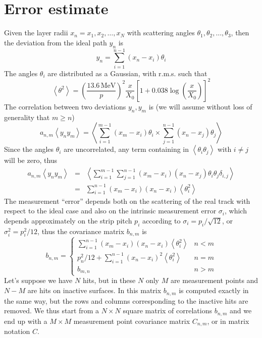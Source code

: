 \documentclass[10pt,a4paper]{article}
\begin{document}
\section{Error estimate}
Given the layer radii $x_n = x_1, x_2, \ldots, x_N$ with scattering angles $\theta_1, \theta_2, \ldots, \theta_3$, then
the deviation from the ideal path $y_n$ is
\begin{equation}
y_n=\sum_{i=1}^{n-1} \left (  x_n - x_i \right ) \theta_i
\end{equation}
The angles $\theta_i$ are distributed as a Gaussian, with r.m.s. such that
\begin{equation}
\left < \theta^2 \right > =
    \left ( \frac {13.6\,\mathrm{MeV}} {p} \right )^2
    \frac x {X_0}
    \left [ 1+ 0.038 \log \left ( \frac x {X_0} \right ) \right ] ^2
\end{equation}
The correlation between two deviations $y_n, y_m$ is (we will assume without loss of generality that $m \geq n$)
\begin{equation}
a_{n,m}\left < y_n y_m \right > =
      \left <
      \sum_{i=1}^{m-1} \left (  x_m - x_i \right ) \theta_i
      \times
      \sum_{j=1}^{n-1} \left (  x_n - x_j \right ) \theta_j
      \right >
\end{equation}
Since the angles $\theta_i$ are uncorrelated, any term containing in $\left < \theta_i \theta_j \right >$ with $i\neq j$ will be zero, thus
\begin{eqnarray}
a_{n,m}\left < y_n y_m \right > & = &
      \left <
      \sum_{i=1}^{m-1} \sum_{j=1}^{n-1}
      \left (  x_m - x_i \right )
      \left (  x_n - x_j \right ) \theta_i \theta_j \delta_{i,j}
      \right > \nonumber \\
      & = &
      \sum_{i=1}^{n-1} 
      \left (  x_m - x_i \right )
      \left (  x_n - x_i \right )  \left < \theta_i^2 \right > 
\end{eqnarray}
The measurement ``error'' depends both on the scattering of the real track with respect to the ideal case
and also on the intrinsic measurement error $\sigma_i$, which depends approximately on the strip pitch $p_i$
according to $\sigma_i = p_i / \sqrt{12}$, or $\sigma_i^2 = p_i^2 / 12$, thus the covariance matrix $b_{n,m}$ is
\begin{equation}
b_{n,m}= \left \{
\begin{array}{cl}
 \sum_{i=1}^{n-1} \left (  x_m - x_i \right ) \left (  x_n - x_i \right )  \left < \theta_i^2 \right > & n<m \\
 p_n^2 / 12 + \sum_{i=1}^{n-1} \left (  x_n - x_i \right )^2  \left < \theta_i^2 \right > & n=m \\
 b_{m,n}  & n>m
\end{array}
\right .
\end{equation}
Let's suppose we have $N$ hits, but in these $N$ only $M$ are measurement points and $N-M$ are hits
on inactive surfaces. In this matrix $b_{n,m}$ is computed exactly in the same way, but the rows
and columns corresponding to the inactive hits are removed. We thus start from a $N\times N$ square matrix
of correlations $b_{n,m}$ and we end up with a $M\times M$ measurement point covariance matrix $C_{n,m}$,
or in matrix notation $C$.


\label{LastPage}
\end{document}
